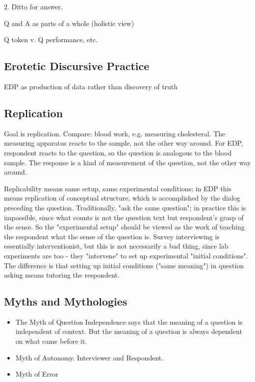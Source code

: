 \documentclass[11pt,twoside]{article}
\begin{document}
2.  Ditto for answer.

Q and A as parts of a whole (holistic view)

Q token v. Q performance, etc.

\subsection{Erotetic Discursive Practice}


EDP as production of data rather than discovery of truth

\subsection{Replication}

Goal is replication.  Compare: blood work, e.g. measuring
cholesteral.  The measuring apparatus reacts to the sample, not the
other way around.  For EDP, respondent reacts to the question, so the
question is analogous to the blood sample.  The response is a kind of
measurement of the question, not the other way around.

Replicability means same setup, same experimental conditions; in EDP
this means replication of conceptual structure, which is accomplished
by the dialog preceding the question.  Traditionally, "ask the same
question"; in practice this is impossible, since what counts is not
the question text but respondent's grasp of the sense.  So the
"experimental setup" should be viewed as the work of teaching the
respondent what the sense of the question is.  Survey interviewing is
essentially interventionist, but this is not necessarily a bad thing,
since lab experiments are too - they "intervene" to set up
experimental "initial conditions".  The difference is that setting up
initial conditions ("same meaning") in question asking means tutoring
the respondent.

\subsection{Myths and Mythologies}

\begin{itemize}
\item The Myth of Question Independence says that the meaning of a
    question is independent of context.  But the meaning of a question
    is always dependent on what came before it.
\item Myth of Autonomy. Interviewer and Respondent.
\item Myth of Error
\end{itemize}
\end{document}
